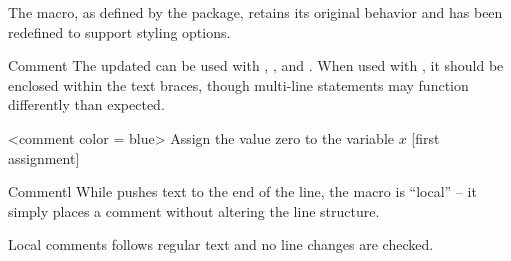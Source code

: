 \documentclass[a4paper, 11pt]{article}
\begin{document}
The  macro, as defined by the  package, retains its original behavior and has been redefined to support styling options.

\begin{Macrodef}{Comment}{}{}
    The updated  can be used with , , and . When used with , it should be enclosed within the text braces, though multi-line statements may function differently than expected.

    \MacroOptionsText
\end{Macrodef}

\begin{PDExample}
    \begin{minipage}{7.5cm}
        \begin{algorithmic}
            <comment color = blue>%
            \State Assign the value zero to the variable $x$
            [first assignment]%
        \end{algorithmic}
    \end{minipage}
\end{PDExample}

\begin{Macrodef}{Commentl}{}{}
    While  pushes text to the end of the line, the  macro is ``local'' -- it simply places a comment without altering the line structure.

    Local comments follows regular text and no line changes are checked.

    \MacroOptionsText
\end{Macrodef}

\begin{PDExample}
    \begin{algorithmic}
        \EndIf
    \end{algorithmic}
\end{PDExample}
\end{document}
